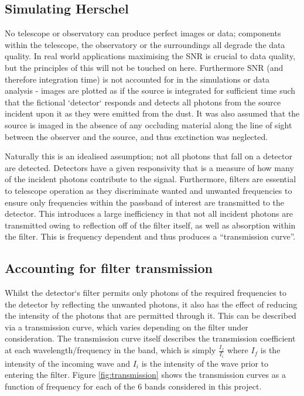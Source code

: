 \documentclass{report}
\begin{document}
\subsection{Simulating Herschel}
No telescope or observatory can produce perfect images or data; components within the telescope, the observatory or the surroundings all degrade the data quality. In real world applications maximising the SNR is crucial to data quality, but the principles of this will not be touched on here. Furthermore SNR (and therefore integration time) is not accounted for in the simulations or data analysis - images are plotted as if the source is integrated for sufficient time such that the fictional `detector` responds and detects all photons from the source incident upon it as they were emitted from the dust. It was also assumed that the source is imaged in the absence of any occluding material along the line of sight between the observer and the source, and thus exctinction was neglected.

Naturally this is an idealised assumption; not all photons that fall on a detector are detected. Detectors have a given responsivity that is a measure of how many of the incident photons contribute to the signal. Furthermore, filters are essential to telescope operation as they discriminate wanted and unwanted frequencies to ensure only frequencies within the passband of interest are transmitted to the detector. This introduces a large inefficiency in that not all incident photons are transmitted owing to reflection off of the filter itself, as well as absorption within the filter. This is frequency dependent and thus produces a ``transmission curve''.

\subsection{Accounting for filter transmission}
Whilst the detector`s filter permits only photons of the required frequencies to the detector by reflecting the unwanted photons, it also has the effect of reducing the intensity of the photons that are permitted through it. This can be described via a transmission curve, which varies depending on the filter under consideration. The transmission curve itself describes the transmission coefficient at each wavelength/frequency in the band, which is simply $\frac{I_{f}}{I_{i}}$ where $I_{f}$ is the intensity of the incoming wave and $I_{i}$ is the intensity of the wave prior to entering the filter. Figure \ref{fig:transmission} shows the transmission curves as a function of frequency for each of the 6 bands considered in this project.
\end{document}
